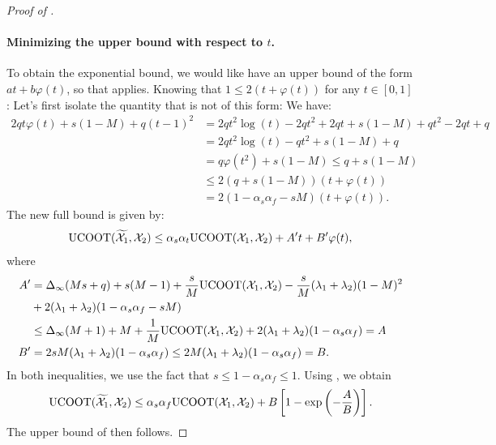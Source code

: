 \begin{proof}[Proof of ]
  \paragraph{Minimizing the upper bound with respect to $t$.}
  To obtain the exponential bound, we would like have an upper bound of the form
  $at + b\varphi(t)$, so that  applies.
  Knowing that $1 \leq 2(t + \varphi(t))$ for any $t \in [0, 1]$:
  Let's first isolate the quantity that is not of this form:
  We have:
  \begin{equation}
    \begin{split}
      2q t \varphi(t) + s(1 - M) + q(t-1)^2 &= 2qt^2\log(t) - 2qt^2 + 2qt + s(1-M) + qt^2 -2qt + q \\
      &=  2qt^2\log(t) - qt^2 + s(1-M) + q \\
      &= q\varphi(t^2) + s(1-M) \leq q + s(1-M) \\
      &\leq 2(q + s(1-M)) (t + \varphi(t)) \\
      &= 2(1 -\alpha_s\alpha_f - sM) (t + \varphi(t)).
    \end{split}
  \end{equation}
  The new full bound is given by:
  \begin{equation}
      \text{UCOOT}(\widetilde{\mathcal X_1}, \mathcal X_2) \leq \alpha_s\alpha_t \text{UCOOT}(\mathcal X_1, \mathcal X_2) + A' t + B'\varphi(t),
  \end{equation}
  where
  \begin{equation}
      \begin{split}
          A' &= \Delta_{\infty}(Ms + q) + s(M-1) + \frac{s}{M}\text{UCOOT}(\mathcal X_1, \mathcal X_2) - \frac{s}{M}(\lambda_1 + \lambda_2)(1-M)^2 \\
          &+ 2(\lambda_1 + \lambda_2) (1-\alpha_s\alpha_f - sM) \\
          & \leq \Delta_{\infty}(M + 1) + M + \frac{1}{M}\text{UCOOT}(\mathcal X_1, \mathcal X_2) + 2(\lambda_1 + \lambda_2) (1-\alpha_s\alpha_f) = A \\
          B' &= 2sM(\lambda_1 + \lambda_2) (1-\alpha_s\alpha_f) \leq 2M(\lambda_1 + \lambda_2) (1-\alpha_s\alpha_f) = B.
      \end{split}
  \end{equation}
  In both inequalities, we use the fact that $s \leq 1 - \alpha_s \alpha_f \leq 1$.
  Using , we obtain
  \begin{equation}
      \text{UCOOT}(\widetilde{\mathcal X_1}, \mathcal X_2)
      \leq \alpha_s\alpha_f \text{UCOOT}(\mathcal X_1, \mathcal X_2) + B \left[ 1 - \exp{ \left(- \frac{A}{B} \right) }\right].
  \end{equation}
  The upper bound of  then follows.
\end{proof}

